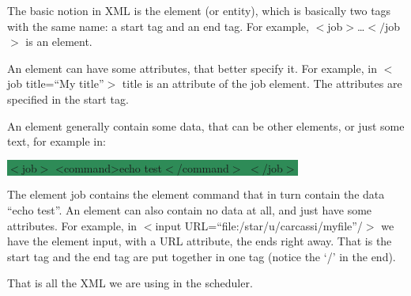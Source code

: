 The basic notion in XML is the element (or entity),
which is basically two tags with the same name:
a start tag and an end tag.
For example, $<$job$>$\dots$<{/}$job$>$ is an element.

An element can have some attributes,
that better specify it.
For example, in $<$job title=\textquotedblleft My title\textquotedblright$>$ title is an attribute of the job element.
The attributes are specified in the start tag.

An element generally contain some data, that can be other elements,
or just some text, for example in:
\begin{center}
  \colorbox{seagreen}{$<$job$>$ <command>echo test$<$/command$>$ $<$/job$>$}
\end{center}
The element job contains the element command that in turn contain the data \textquotedblleft{echo test}\textquotedblright.
An element can also contain no data at all,
and just have some attributes.
For example, in $<$input URL=\textquotedblleft{}file:/star/u/carcassi/myfile\textquotedblright{}/$>$ we have the element input,
with a URL attribute, the ends right away.
That is the start tag and the end tag are put together in one tag (notice the \textquoteleft{}/\textquoteright{} in the end).

That is all the XML we are using in the scheduler.

